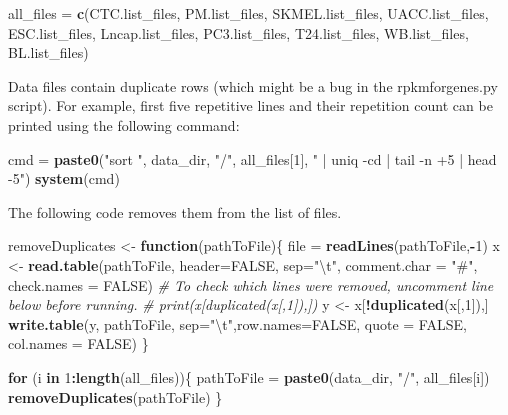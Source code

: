 \documentclass[]{article}
\newenvironment{Shaded}{\begin{snugshade}}{\end{snugshade}}
\newcommand{\KeywordTok}[1]{\textcolor[rgb]{0.13,0.29,0.53}{\textbf{#1}}}
\newcommand{\DataTypeTok}[1]{\textcolor[rgb]{0.13,0.29,0.53}{#1}}
\newcommand{\DecValTok}[1]{\textcolor[rgb]{0.00,0.00,0.81}{#1}}
\newcommand{\CharTok}[1]{\textcolor[rgb]{0.31,0.60,0.02}{#1}}
\newcommand{\StringTok}[1]{\textcolor[rgb]{0.31,0.60,0.02}{#1}}
\newcommand{\CommentTok}[1]{\textcolor[rgb]{0.56,0.35,0.01}{\textit{#1}}}
\newcommand{\OtherTok}[1]{\textcolor[rgb]{0.56,0.35,0.01}{#1}}
\newcommand{\ControlFlowTok}[1]{\textcolor[rgb]{0.13,0.29,0.53}{\textbf{#1}}}
\newcommand{\OperatorTok}[1]{\textcolor[rgb]{0.81,0.36,0.00}{\textbf{#1}}}
\newcommand{\NormalTok}[1]{#1}
\begin{document}
\begin{Shaded}
\begin{Highlighting}[]
\NormalTok{all_files =}\StringTok{ }\KeywordTok{c}\NormalTok{(CTC.list_files, PM.list_files, SKMEL.list_files, UACC.list_files,}
\NormalTok{              ESC.list_files, Lncap.list_files, PC3.list_files,}
\NormalTok{              T24.list_files, WB.list_files, BL.list_files)}
\end{Highlighting}
\end{Shaded}

Data files contain duplicate rows (which might be a bug in the
rpkmforgenes.py script). For example, first five repetitive lines and
their repetition count can be printed using the following command:

\begin{Shaded}
\begin{Highlighting}[]
\NormalTok{cmd =}\StringTok{ }\KeywordTok{paste0}\NormalTok{(}\StringTok{"sort "}\NormalTok{, data_dir, }\StringTok{"/"}\NormalTok{, all_files[}\DecValTok{1}\NormalTok{], }\StringTok{" | uniq -cd | tail -n +5 |  head -5"}\NormalTok{)}
\KeywordTok{system}\NormalTok{(cmd)}
\end{Highlighting}
\end{Shaded}

The following code removes them from the list of files.

\begin{Shaded}
\begin{Highlighting}[]
\NormalTok{removeDuplicates <-}\StringTok{ }\ControlFlowTok{function}\NormalTok{(pathToFile)\{}
\NormalTok{  file =}\StringTok{ }\KeywordTok{readLines}\NormalTok{(pathToFile,}\OperatorTok{-}\DecValTok{1}\NormalTok{)}
\NormalTok{  x <-}\StringTok{ }\KeywordTok{read.table}\NormalTok{(pathToFile, }\DataTypeTok{header=}\OtherTok{FALSE}\NormalTok{, }\DataTypeTok{sep=}\StringTok{"}\CharTok{\textbackslash{}t}\StringTok{"}\NormalTok{, }\DataTypeTok{comment.char =} \StringTok{"#"}\NormalTok{, }\DataTypeTok{check.names =} \OtherTok{FALSE}\NormalTok{)}
  \CommentTok{# To check which lines were removed, uncomment line below before running.}
  \CommentTok{# print(x[duplicated(x[,1]),])}
\NormalTok{  y <-}\StringTok{ }\NormalTok{x[}\OperatorTok{!}\KeywordTok{duplicated}\NormalTok{(x[,}\DecValTok{1}\NormalTok{]),]}
  \KeywordTok{write.table}\NormalTok{(y, pathToFile, }\DataTypeTok{sep=}\StringTok{"}\CharTok{\textbackslash{}t}\StringTok{"}\NormalTok{,}\DataTypeTok{row.names=}\OtherTok{FALSE}\NormalTok{, }\DataTypeTok{quote =} \OtherTok{FALSE}\NormalTok{, }\DataTypeTok{col.names =} \OtherTok{FALSE}\NormalTok{)}
\NormalTok{\}}

\ControlFlowTok{for}\NormalTok{ (i }\ControlFlowTok{in} \DecValTok{1}\OperatorTok{:}\KeywordTok{length}\NormalTok{(all_files))\{}
\NormalTok{  pathToFile =}\StringTok{ }\KeywordTok{paste0}\NormalTok{(data_dir, }\StringTok{"/"}\NormalTok{, all_files[i])}
  \KeywordTok{removeDuplicates}\NormalTok{(pathToFile)}
\NormalTok{\}}
\end{Highlighting}
\end{Shaded}
\end{document}
